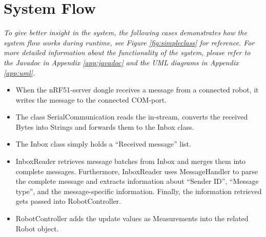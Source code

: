 \newpage
\section{System Flow}
\label{secr:systemflow}
\textit{To give better insight in the system, the following cases demonstrates how the system flow works during runtime, see Figure \ref{fig:simpleclass} for reference. For more detailed information about the functionality of the system, please refer to the  Javadoc in Appendix \ref{app:javadoc} and the UML diagrams in Appendix \ref{app:uml}.}

\begin{itemize}
    \item When the nRF51-server dongle receives a message from a connected robot, it writes the message to the connected COM-port.
    \item The class SerialCommunication reads the in-stream, converts the received Bytes into Strings and forwards them to the Inbox class.
    \item The Inbox class simply holds a ``Received message'' list.
    \item InboxReader retrieves message batches from Inbox and merges them into complete messages. Furthermore, InboxReader uses MessageHandler to parse the complete message and extracts information about ``Sender ID'', ``Message type'', and the message-specific information. Finally, the information retrieved gets passed into RobotController.
    \item RobotController adds the update values as Measurements into the related Robot object.
\end{itemize}

